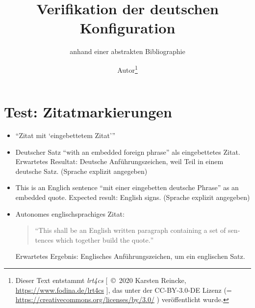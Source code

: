 \documentclass[
  DIV=calc,i
  BCOR=5mm,
  11pt,
  headings=small,
  oneside,
  abstract=true,
  toc=bib,
  english,ngerman]{scrartcl}
\begin{document}
\nocite{*}

\titlehead{Bib\LaTeX}
\subject{Release 1.0}
\title{Verifikation der deutschen Konfiguration}
\subtitle{anhand einer abstrakten Bibliographie}
\author{Autor\footnote{Dieser Text entstammt \emph{lrt4cs} [\ \copyright\ 2020 Karsten Reincke, \href{https://www.fodina.de/lrt4cs}{https://www.fodina.de/lrt4cs} ], das unter der CC-BY-3.0-DE Lizenz (= \href{https://creativecommons.org/licenses/by/3.0/}{https://creativecommons.org/licenses/by/3.0/} ) veröffentlicht wurde.}}


\maketitle

\footnotesize
\tableofcontents

\normalsize
\section{Test: Zitatmarkierungen}
\begin{itemize}

  \item \enquote{Zitat mit \enquote{eingebettetem Zitat}}

  \item Deutscher Satz \foreignquote{german}{with an embedded foreign phrase} als eingebettetes Zitat. Erwartetes Resultat: Deutsche Anführungszeichen, weil Teil in einem deutsche Satz. (Sprache explizit angegeben)

  \item This is an Englich sentence \foreignquote{english}{mit einer eingebetten deutsche Phrase} as an embedded quote. Expected result: English signs. (Sprache explizit angegeben)

  \item Autonomes englischsprachiges Zitat:
  \begin{quote}\foreignquote{english}{This shall be an English written paragraph containing a set of sentences which together build the quote.}\end{quote}

  Erwartetes Ergebnis: Englisches Anführungszeichen, um ein englischen Satz.
\end{itemize}
\end{document}
